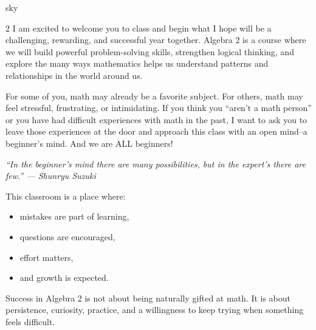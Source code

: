 \documentclass[12pt]{article}
\begin{document}
    \begin{center}
        {\Large\bfseries \CourseName \quad \SchoolYear}
    \end{center}

    \renewcommand{\arraystretch}{1.6}
    \begin{skillbox}{sky}
        \setlength{\parskip}{0.6em}
        \setlength{\parindent}{0pt}
        \setlength{\columnsep}{1cm}
        \begin{multicols}{2}
            \raggedcolumns
            I am excited to welcome you to class and begin what I hope will be
            a challenging, rewarding, and successful year together. Algebra 2 is
            a course where we will build powerful problem-solving skills, strengthen
            logical thinking, and explore the many ways mathematics helps us
            understand patterns and relationships in the world around us.

            For some of you, math may already be a favorite subject. For others,
            math may feel stressful, frustrating, or intimidating. If you think
            you “aren’t a math person” or you have had difficult experiences
            with math in the past, I want to ask you to leave those experiences at the door
            and approach this class with an open mind--a beginner's mind.  And we are ALL
            beginners!

            \vspace{1em}
            \begin{center}
            \itshape
            “In the beginner’s mind there are many possibilities,
            but in the expert’s there are few.”
            \vspace{0.5em}
            --- Shunryu Suzuki
            \end{center}
            \vspace{1em}

            This classroom is a place where:
            \begin{itemize}
                \item mistakes are part of learning,
                \item questions are encouraged,
                \item effort matters,
                \item and growth is expected.
            \end{itemize}

            Success in Algebra 2 is not about being naturally gifted at math.
            It is about persistence, curiosity, practice, and a willingness
            to keep trying when something feels difficult.


\end{multicols}
\end{skillbox}
\end{document}
